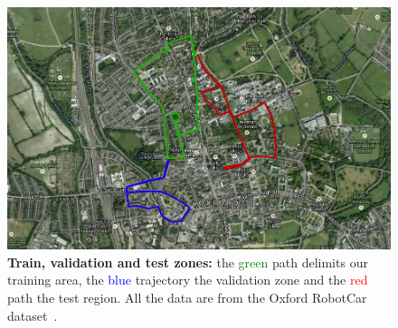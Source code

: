 \begin{figure}
	\centering
	
	\begin{minipage}{0.5\linewidth}
		\includegraphics[width=\linewidth]{details/map}
	\end{minipage}\hfill	
	\begin{minipage}{0.5\linewidth}
		\caption[Data repartition]{\label{fig:data_repartition} \textbf{Train, validation and test zones:} the \textcolor{green}{green} path delimits our training area, the \textcolor{blue}{blue} trajectory the validation zone and the \textcolor{red}{red} path the test region. All the data are from the Oxford RobotCar dataset~\citep{Maddern2016}.}
	\end{minipage}

\end{figure}
